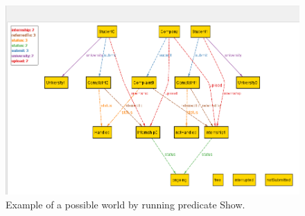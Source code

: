 \begin{figure}[H]
    \begin{center}
        \includegraphics[width=\linewidth]{RASD//Images//Alloy/show.png}
        \caption{Example of a possible world by running predicate Show.}
        \label{fig:show_world_alloy}%
    \end{center}
\end{figure}